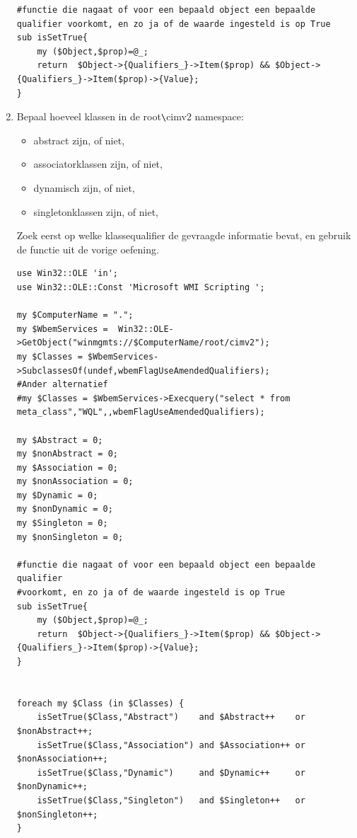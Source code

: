 \documentclass[11pt,a4paper]{report}
\begin{document}
\begin{enumerate}[resume]
\begin{lstlisting}
#functie die nagaat of voor een bepaald object een bepaalde qualifier voorkomt, en zo ja of de waarde ingesteld is op True
sub isSetTrue{
	my ($Object,$prop)=@_;
	return  $Object->{Qualifiers_}->Item($prop) && $Object->{Qualifiers_}->Item($prop)->{Value};
}
	\end{lstlisting}
	\item Bepaal hoeveel klassen in de root\verb+\+cimv2 namespace:
	\begin{itemize}
	\item abstract zijn, of niet,
	\item associatorklassen zijn, of niet,
	\item dynamisch zijn, of niet,
	\item singletonklassen zijn, of niet,
	\end{itemize}
	Zoek eerst op welke klassequalifier de gevraagde informatie bevat, en gebruik de functie uit de vorige oefening.
	\newpage
	\begin{lstlisting}
use Win32::OLE 'in';
use Win32::OLE::Const 'Microsoft WMI Scripting ';

my $ComputerName = ".";
my $WbemServices =  Win32::OLE->GetObject("winmgmts://$ComputerName/root/cimv2");
my $Classes = $WbemServices->SubclassesOf(undef,wbemFlagUseAmendedQualifiers);
#Ander alternatief
#my $Classes = $WbemServices->Execquery("select * from meta_class","WQL",,wbemFlagUseAmendedQualifiers);

my $Abstract = 0;
my $nonAbstract = 0;
my $Association = 0;
my $nonAssociation = 0;
my $Dynamic = 0;
my $nonDynamic = 0;
my $Singleton = 0;
my $nonSingleton = 0;

#functie die nagaat of voor een bepaald object een bepaalde qualifier 
#voorkomt, en zo ja of de waarde ingesteld is op True
sub isSetTrue{
	my ($Object,$prop)=@_;
	return  $Object->{Qualifiers_}->Item($prop) && $Object->{Qualifiers_}->Item($prop)->{Value};
}


foreach my $Class (in $Classes) {
	isSetTrue($Class,"Abstract")    and $Abstract++    or $nonAbstract++;
	isSetTrue($Class,"Association") and $Association++ or $nonAssociation++;
	isSetTrue($Class,"Dynamic")     and $Dynamic++     or $nonDynamic++;
	isSetTrue($Class,"Singleton")   and $Singleton++   or $nonSingleton++;
}


\end{lstlisting}
\end{enumerate}
\end{document}
